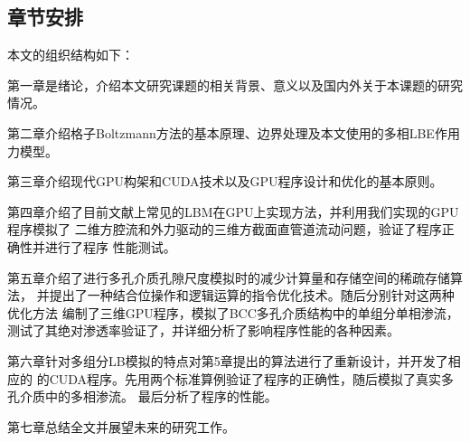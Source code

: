 \subsection{章节安排}
本文的组织结构如下：

第一章是绪论，介绍本文研究课题的相关背景、意义以及国内外关于本课题的研究情况。

第二章介绍格子Boltzmann方法的基本原理、边界处理及本文使用的多相LBE作用力模型。

第三章介绍现代GPU构架和CUDA技术以及GPU程序设计和优化的基本原则。

第四章介绍了目前文献上常见的LBM在GPU上实现方法，并利用我们实现的GPU程序模拟了
二维方腔流和外力驱动的三维方截面直管道流动问题，验证了程序正确性并进行了程序
性能测试。

第五章介绍了进行多孔介质孔隙尺度模拟时的减少计算量和存储空间的稀疏存储算法，
并提出了一种结合位操作和逻辑运算的指令优化技术。随后分别针对这两种优化方法
编制了三维GPU程序，模拟了BCC多孔介质结构中的单组分单相渗流，
测试了其绝对渗透率验证了，并详细分析了影响程序性能的各种因素。

第六章针对多组分LB模拟的特点对第5章提出的算法进行了重新设计，并开发了相应的
的CUDA程序。先用两个标准算例验证了程序的正确性，随后模拟了真实多孔介质中的多相渗流。
最后分析了程序的性能。

第七章总结全文并展望未来的研究工作。
